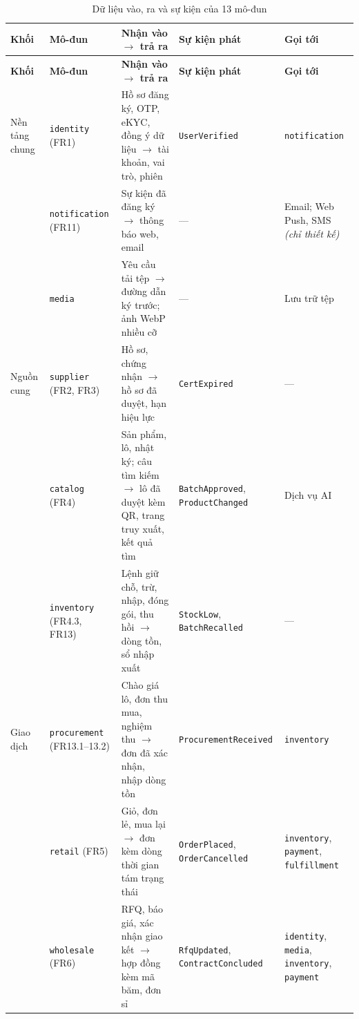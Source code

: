 \begingroup
\tblsetup\tblzebra
\begin{longtable}{L{1.55cm} L{2.40cm} L{5.00cm} L{2.85cm} L{2.40cm}}
\caption{Dữ liệu vào, ra và sự kiện của 13 mô-đun}
\label{tab:module-io} \\
\toprule
{}
\textbf{Khối} & \textbf{Mô-đun} & \textbf{Nhận vào $\rightarrow$ trả ra} & \textbf{Sự kiện phát} & \textbf{Gọi tới} \\
\midrule
\endfirsthead
\toprule
{}
\textbf{Khối} & \textbf{Mô-đun} & \textbf{Nhận vào $\rightarrow$ trả ra} & \textbf{Sự kiện phát} & \textbf{Gọi tới} \\
\midrule
\endhead
\bottomrule
\endfoot
Nền tảng chung & \texttt{identity} (FR1) & Hồ sơ đăng ký, OTP, eKYC, đồng ý dữ liệu $\rightarrow$ tài khoản, vai trò, phiên & \texttt{UserVerified} & \texttt{notification} \\
& \texttt{notification} (FR11) & Sự kiện đã đăng ký $\rightarrow$ thông báo web, email & --- & Email; Web Push, SMS \emph{(chỉ thiết kế)} \\
& \texttt{media} & Yêu cầu tải tệp $\rightarrow$ đường dẫn ký trước; ảnh WebP nhiều cỡ & --- & Lưu trữ tệp \\
Nguồn cung & \texttt{supplier} (FR2, FR3) & Hồ sơ, chứng nhận $\rightarrow$ hồ sơ đã duyệt, hạn hiệu lực & \texttt{CertExpired} & --- \\
& \texttt{catalog} (FR4) & Sản phẩm, lô, nhật ký; câu tìm kiếm $\rightarrow$ lô đã duyệt kèm QR, trang truy xuất, kết quả tìm & \texttt{BatchApproved}, \texttt{ProductChanged} & Dịch vụ AI \\
& \texttt{inventory} (FR4.3, FR13) & Lệnh giữ chỗ, trừ, nhập, đóng gói, thu hồi $\rightarrow$ dòng tồn, sổ nhập xuất & \texttt{StockLow}, \texttt{BatchRecalled} & --- \\
Giao dịch & \texttt{procurement} (FR13.1--13.2) & Chào giá lô, đơn thu mua, nghiệm thu $\rightarrow$ đơn đã xác nhận, nhập dòng tồn & \texttt{ProcurementReceived} & \texttt{inventory} \\
& \texttt{retail} (FR5) & Giỏ, đơn lẻ, mua lại $\rightarrow$ đơn kèm dòng thời gian tám trạng thái & \texttt{OrderPlaced}, \texttt{OrderCancelled} & \texttt{inventory}, \texttt{payment}, \texttt{fulfillment} \\
& \texttt{wholesale} (FR6) & RFQ, báo giá, xác nhận giao kết $\rightarrow$ hợp đồng kèm mã băm, đơn sỉ & \texttt{RfqUpdated}, \texttt{ContractConcluded} & \texttt{identity}, \texttt{media}, \texttt{inventory}, \texttt{payment} \\

\end{longtable}
